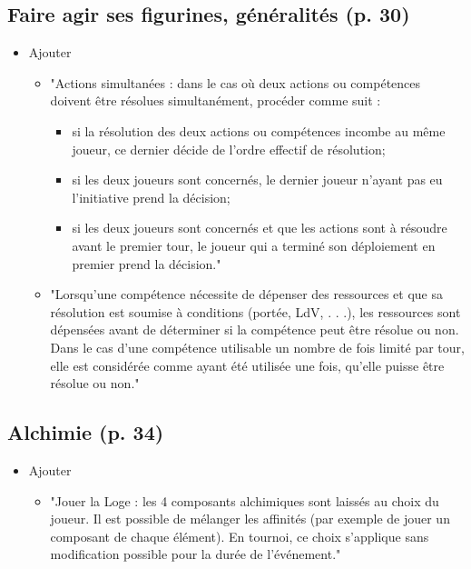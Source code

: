 \documentclass[a4paper,12pt]{article}
\begin{document}
\begin{multicols}{2}
		\subsection*{Faire agir ses figurines, généralités (p. 30)}
		\begin{itemize}
			\item Ajouter
			\begin{itemize}
				\item "Actions simultanées : dans le cas où deux actions ou compétences doivent être résolues simultanément, procéder comme suit :
				\begin{itemize}
					\item si la résolution des deux actions ou compétences incombe au même joueur, ce dernier décide de l’ordre effectif de résolution;
					\item si les deux joueurs sont concernés, le dernier joueur n’ayant pas eu l’initiative prend la décision;
					\item si les deux joueurs sont concernés et que les actions sont à résoudre avant le premier tour, le joueur qui a terminé son déploiement en premier prend la décision."
				\end{itemize}
				\item "Lorsqu’une compétence nécessite de dépenser des ressources et que sa résolution est soumise à conditions (portée, LdV, . . .), les ressources sont dépensées avant de déterminer si la compétence peut être résolue ou non. Dans le cas d’une compétence utilisable un nombre de fois limité par tour, elle est considérée comme ayant été utilisée une fois, qu’elle puisse être résolue ou non."
			\end{itemize}
		\end{itemize}
		
		\subsection*{Alchimie (p. 34)}
		\begin{itemize}
			\item Ajouter
			\begin{itemize}
				\item "Jouer la Loge : les 4 composants alchimiques sont laissés au choix du joueur. Il est possible de mélanger les affinités (par exemple de jouer un composant de chaque élément). En tournoi, ce choix s’applique sans modification possible pour la durée de l’événement."
			\end{itemize}
		\end{itemize}
		

\end{multicols}
\end{document}
